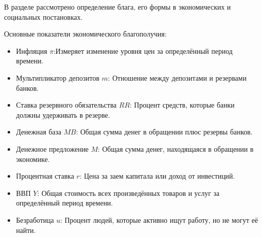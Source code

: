 В разделе рассмотрено определение блага, его формы в экономических и социальных постановках.

Основные показатели экономического благополучия:
\begin{itemize}
    \item Инфляция $\pi$:Измеряет изменение уровня цен за определённый период времени.
    \item Мультипликатор депозитов $m$: Отношение между депозитами и резервами банков.
    \item Ставка резервного обязательства $RR$: Процент средств, которые банки должны удерживать в резерве.
    \item Денежная база $MB$: Общая сумма денег в обращении плюс резервы банков.
    \item Денежное предложение $M$: Общая сумма денег, находящаяся в обращении в экономике.
    \item Процентная ставка $r$: Цена за заем капитала или доход от инвестиций.
    \item ВВП $Y$: Общая стоимость всех произведённых товаров и услуг за определённый период времени.
    \item Безработица $u$: Процент людей, которые активно ищут работу, но не могут её найти.
\end{itemize}



